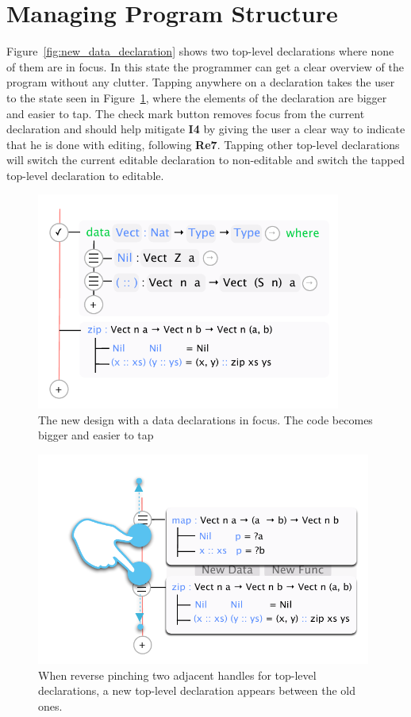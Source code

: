 \section{Managing Program Structure}
\label{subsec:managing_program_structure}
Figure~\ref{fig:new_data_declaration} shows two top-level declarations
where none of them are in focus. 
In this state the programmer can get a clear overview of the program without any clutter. 
Tapping anywhere on a declaration takes the user to the state seen in Figure~\ref{fig:new_design_data_in_focus}, where the elements of the declaration are bigger and easier to tap.
The check mark button removes focus from the current declaration and should help mitigate \textbf{I4} by giving the user a clear way to indicate that he is done with editing, following \textbf{Re7}.
Tapping other top-level declarations will switch the current editable declaration to non-editable and switch the tapped top-level declaration to editable.

\begin{figure}
	\centering
		\includegraphics[width=100mm]{diagrams/final_design_top_dec_in_focus.pdf}
	\caption{The new design with a data declarations in focus. The code becomes
	bigger and easier to tap}
\label{fig:new_design_data_in_focus}
\end{figure}

\begin{figure}
	\centering
		\includegraphics[width=110mm]{diagrams/new_function_reverse_pinch.pdf}
	\caption{When reverse pinching two adjacent handles for top-level
	declarations, a new top-level declaration appears between the old ones.}
\label{fig:new_function_reverse_pinch}
\end{figure}

